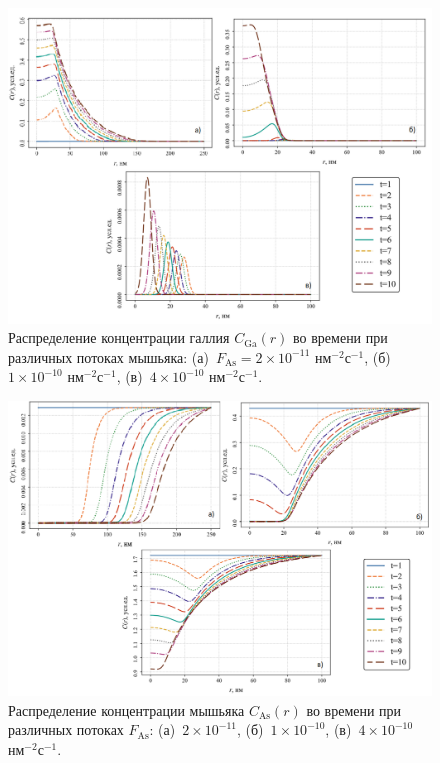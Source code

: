 \documentclass[14pt,oneside]{extarticle}
\begin{document}
\begin{figure}
    \begin{center}
    \includegraphics[width=18cm]{images/C_Ga_t_2.png}
    \caption{\label{fig:ga_flux_2} Распределение концентрации галлия $C_{\text{Ga}}(r)$ во времени при различных потоках мышьяка: (а)~$F_{\text{As}} = 2 \times 10^{-11}$ нм$^{-2}$с$^{-1}$, (б)~$1 \times 10^{-10}$ нм$^{-2}$с$^{-1}$, (в)~$4 \times 10^{-10}$ нм$^{-2}$с$^{-1}$.}
    \end{center}
\end{figure}

\begin{figure}
    \begin{center}
    \includegraphics[width=18cm]{images/C_As_t_2.png}
    \caption{\label{fig:as_flux_2} Распределение концентрации мышьяка $C_{\text{As}}(r)$ во времени при различных потоках $F_{\text{As}}$: (а)~$2 \times 10^{-11}$, (б)~$1 \times 10^{-10}$, (в)~$4 \times 10^{-10}$ нм$^{-2}$с$^{-1}$.}
    \end{center}
\end{figure}
\end{document}
